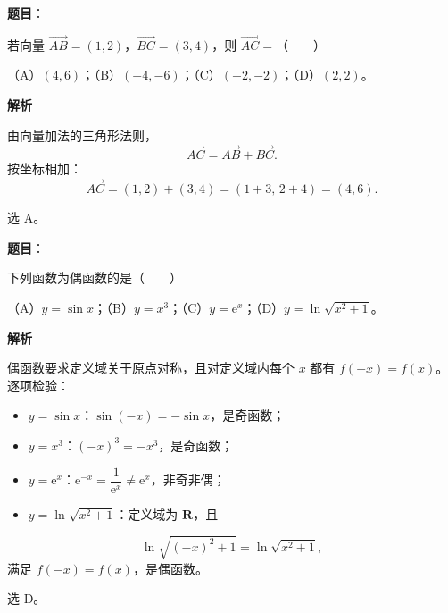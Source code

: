 \begin{answer}

\textbf{题目}：

若向量 $\overrightarrow{AB}=(1,2)$，$\overrightarrow{BC}=(3,4)$，则 $\overrightarrow{AC}=$\mbox{（　　）}

（A）$(4,6)$；（B）$(-4,-6)$；（C）$(-2,-2)$；（D）$(2,2)$。

\textbf{解析}

由向量加法的三角形法则，
\nopagebreak[4]
\[\overrightarrow{AC}=\overrightarrow{AB}+\overrightarrow{BC}.\]
按坐标相加：
\nopagebreak[4]
\[\overrightarrow{AC}=(1,2)+(3,4)=(1+3,\,2+4)=(4,6).\]

选 A。


\end{answer}
\begin{answer}

\textbf{题目}：

下列函数为偶函数的是\mbox{（　　）}

（A）$y=\sin x$；（B）$y=x^3$；（C）$y=\mathrm e^x$；（D）$y=\ln\sqrt{x^2+1}$。

\textbf{解析}

偶函数要求定义域关于原点对称，且对定义域内每个 $x$ 都有 $f(-x)=f(x)$。逐项检验：

\begin{itemize}
\item $y=\sin x$：$\sin(-x)=-\sin x$，是奇函数；
\item $y=x^3$：$(-x)^3=-x^3$，是奇函数；
\item $y=\mathrm e^x$：$\mathrm e^{-x}=\dfrac1{\mathrm e^x}\neq\mathrm e^x$，非奇非偶；
\item $y=\ln\sqrt{x^2+1}$：定义域为 $\mathbf R$，且
\end{itemize}
\nopagebreak[4]
\[\ln\sqrt{(-x)^2+1}=\ln\sqrt{x^2+1},\]
满足 $f(-x)=f(x)$，是偶函数。

选 D。


\end{answer}
